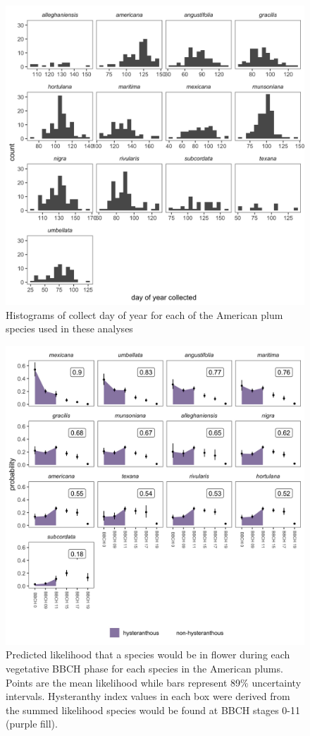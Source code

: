 \documentclass{article}[11pt]
\begin{document}
\begin{figure}[h!]
    \centering
 \includegraphics[width=.5\textwidth]{..//..//Plots/whatReviwerswant/seasonal_distrbn.jpeg}
   
     \caption{Histograms of collect day of year for each of the American plum species used in these analyses}
      \label{fig:bias}
\end{figure}


\begin{figure}[h!]
    \centering
 \includegraphics[width=.7\textwidth]{..//..//Plots/whatReviwerswant/sps_preds_nodoy4supp.jpeg}
    \caption{Predicted likelihood that a species would be in flower during each vegetative BBCH phase for each species in the American plums. Points are the mean likelihood while bars represent 89\% uncertainty intervals. Hysteranthy index values in each box were derived from the summed likelihood  species would be found at BBCH stages 0-11 (purple fill).}
    \label{fig:nodoy}
\end{figure}
\end{document}
